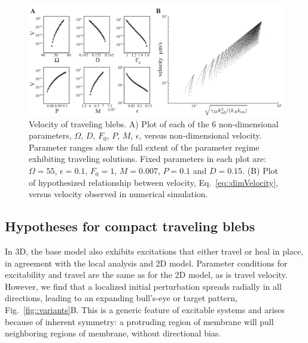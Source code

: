 \begin{figure}
   \begin{center}
   \captionsetup{width=17cm}
     \includegraphics*[width=17cm,center]{Project1/figs/figure5}
      \caption{Velocity of traveling blebs. A) Plot of each of the 6 non-dimensional parameters, $\Omega$, $D$, $F_0$, $P$, $M$, $\epsilon$, versus non-dimensional velocity. Parameter ranges show the full extent of the parameter regime exhibiting traveling solutions. Fixed parameters in each plot are: $\Omega = 55$, $\epsilon = 0.1$, $F_0 = 1$, $M = 0.007$, $P = 0.1$ and $D = 0.15$. (B) Plot of hypothesized relationship between velocity, Eq.~\ref{eq::dimVelocity}, versus velocity observed in numerical simulation.}
      \label{fig::velocity}
   \end{center}
\end{figure}

\subsection{Hypotheses for compact traveling blebs}

In 3D, the base model also exhibits excitations that either travel or heal in place, in agreement with the local analysis and 2D model. Parameter conditions for excitability and travel are the same as for the 2D model, as is travel velocity. However, we find that a localized initial perturbation spreads radially in all directions, leading to an expanding bull's-eye or target pattern, Fig.~\ref{fig::variants}B. This is a generic feature of excitable systems and arises because of  inherent symmetry: a protruding region of membrane will pull neighboring regions of membrane, without directional bias. 

